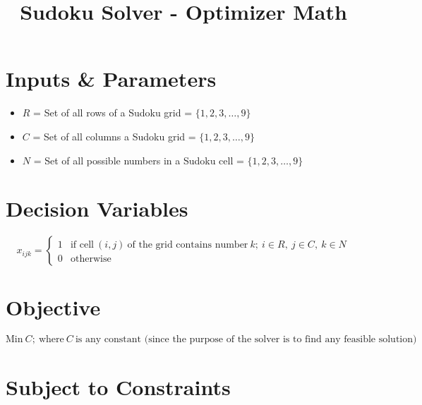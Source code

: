 \documentclass{article}
\title{Sudoku Solver - Optimizer Math \vspace{-3em}}
\date{}
\author{}
\begin{document}
\maketitle


\section{Inputs \& Parameters}

\begin{itemize}
    \item $R$ = Set of all rows of a Sudoku grid = $\{1, 2, 3, \dots, 9\}$
    \item $C$ = Set of all columns a Sudoku grid = $\{1, 2, 3, \dots, 9\}$
    \item $N$ = Set of all possible numbers in a Sudoku cell = $\{1, 2, 3, \dots, 9\}$
\end{itemize}

\section{Decision Variables}
    \begin{equation*}
        x_{ijk} = \begin{cases}
            1 & \text{if cell} ~ (i, j) ~ \text{of the grid contains number} ~ k; ~ i \in R, ~ j \in C, ~ k \in N \\
            0 & \text{otherwise}
        \end{cases}
    \end{equation*}
\section{Objective}

\begin{equation*}
    \text{Min} ~ C; ~ \text{where} ~ C ~ \text{is any constant (since the purpose of the solver is to find any feasible solution)}
\end{equation*}

\section{Subject to Constraints}
\end{document}
